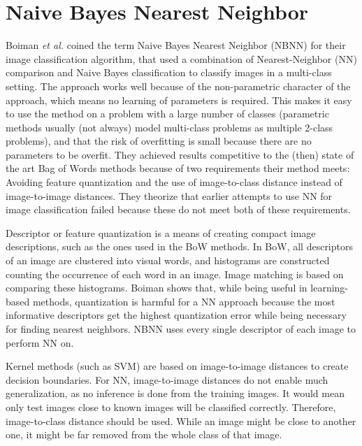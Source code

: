 \documentclass[a4paper,10pt]{article}
\begin{document}
\section{Naive Bayes Nearest Neighbor} %
\label{sec:naive_bayes_nearest_neighbor}

Boiman \emph{et al.} \cite{boiman2008defense} coined the term Naive Bayes Nearest Neighbor (NBNN) for their image classification algorithm, that used a combination of Nearest-Neighbor (NN) comparison and Naive Bayes classification to classify images in a multi-class setting. The approach works well because of the non-parametric character of the approach, which means no learning of parameters is required. This makes it easy to use the method on a problem with a large number of classes (parametric methods usually (not always) model multi-class problems as multiple 2-class problems), and that the risk of overfitting is small because there are no parameters to be overfit. They achieved results competitive to the (then) state of the art Bag of Words methods because of two requirements their method meets: Avoiding feature quantization and the use of image-to-class distance instead of image-to-image distances. They theorize that earlier attempts to use NN  for image classification failed because these do not meet both of these requirements.

Descriptor or feature quantization is a means of creating compact image descriptions, such as the ones used in the BoW methods. In BoW, all descriptors of an image are clustered into visual words, and histograms are constructed counting the occurrence of each word in an image. Image matching is based on comparing these histograms. Boiman shows that, while being useful in learning-based methods, quantization is harmful for a NN approach because the most informative descriptors get the highest quantization error while being necessary for finding nearest neighbors. NBNN uses every single descriptor of each image to perform NN on.

Kernel methods (such as SVM) are based on image-to-image distances to create decision boundaries. For NN, image-to-image distances do not enable much generalization, as no inference is done from the training images. It would mean only test images close to known images will be classified correctly. Therefore, image-to-class distance should be used. While an image might be close to another one, it might be far removed from the whole class of that image. \cite{wang2009learning}
\end{document}
